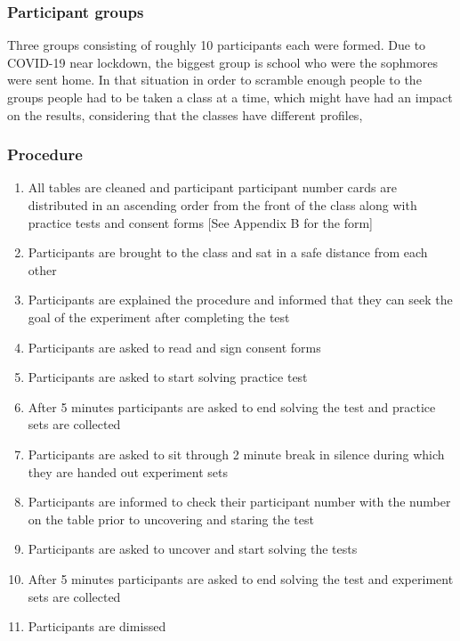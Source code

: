 \documentclass[12pt, a4]{article}
\begin{document}
\subsubsection*{Participant groups}
Three groups consisting of roughly 10 participants each were formed. Due to COVID-19 near lockdown, the biggest group is school who were the sophmores were sent home. In that
situation in order to scramble enough people to the groups people had to be taken a class at a time, which might have had an impact on the results, considering that the classes
have different profiles,
\subsubsection*{Procedure}
\begin{enumerate}
    \item All tables are cleaned and participant participant number cards are distributed in an ascending order from the front of the class along with practice tests and consent
        forms [See Appendix B for the form]
    \item Participants are brought to the class and sat in a safe distance from each other
    \item Participants are explained the procedure and informed that they can seek the goal of the experiment after completing the test
    \item Participants are asked to read and sign consent forms
    \item Participants are asked to start solving practice test
    \item After 5 minutes participants are asked to end solving the test and practice sets are collected
    \item Participants are asked to sit through 2 minute break in silence during which they are handed out experiment sets
    \item Participants are informed to check their participant number with the number on the table prior to uncovering and staring the test
    \item Participants are asked to uncover and start solving the tests
    \item After 5 minutes participants are asked to end solving the test and experiment sets are collected
    \item Participants are dimissed
\end{enumerate}
\end{document}

